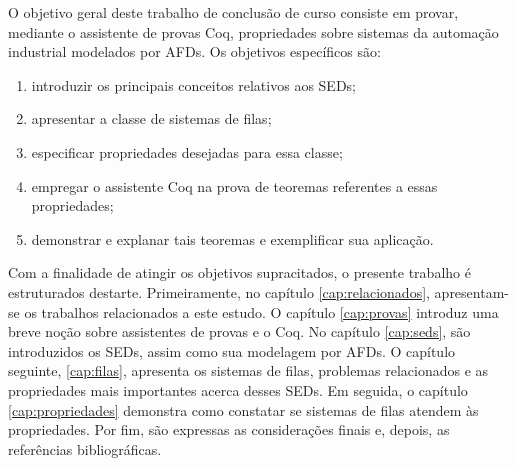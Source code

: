 O objetivo geral deste trabalho de conclusão de curso consiste em provar, mediante o assistente de provas Coq, propriedades sobre sistemas da automação industrial modelados por AFDs. Os objetivos específicos são: \begin{enumerate}
	\item introduzir os principais conceitos relativos aos SEDs;
	\item apresentar a classe de sistemas de filas;
	\item especificar propriedades desejadas para essa classe;
	\item empregar o assistente Coq na prova de teoremas referentes a essas propriedades;
	\item demonstrar e explanar tais teoremas e exemplificar sua aplicação.
\end{enumerate}

Com a finalidade de atingir os objetivos supracitados, o presente trabalho é estruturados destarte. Primeiramente, no capítulo \ref{cap:relacionados}, apresentam-se os trabalhos relacionados a este estudo. O capítulo \ref{cap:provas} introduz uma breve noção sobre assistentes de provas e o Coq. No capítulo \ref{cap:seds}, são introduzidos os SEDs, assim como sua modelagem por AFDs. O capítulo seguinte, \ref{cap:filas}, apresenta os sistemas de filas, problemas relacionados e as propriedades mais importantes acerca desses SEDs. Em seguida, o capítulo \ref{cap:propriedades} demonstra como constatar se sistemas de filas atendem às propriedades. Por fim, são expressas as considerações finais e, depois, as referências bibliográficas.